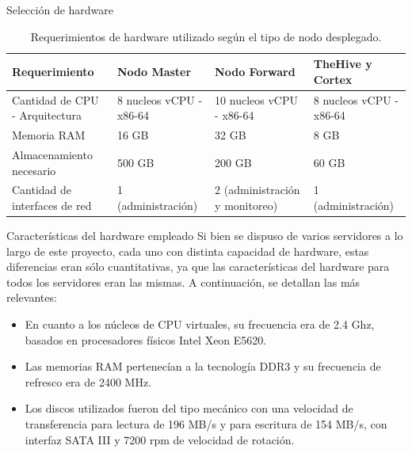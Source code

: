 \begin{subsection}{Selección de hardware}
\begin{table}[H]
\begin{tabular}{|m{9em}|m{9em}|m{9em}|m{9em}|}
                \hline 
                    Requerimiento  & Nodo Master &  Nodo Forward & TheHive y Cortex \\ 
                \hline
                    Cantidad de CPU - Arquitectura & 8 nucleos vCPU - x86-64 & 10 nucleos vCPU - x86-64 & 8 nucleos vCPU - x86-64 \\ 
                \hline
                    Memoria RAM  & 16 GB & 32 GB & 8 GB \\ 
                \hline
                    Almacenamiento necesario & 500 GB  & 200 GB & 60 GB \\
                \hline
            Cantidad de interfaces de red & 1 (administración) & 2 (administración y monitoreo) & 1 (administración) \\
                \hline %
            \end{tabular}
            \caption{Requerimientos de hardware utilizado según el tipo de nodo desplegado.}
            \label{table:12}
        \end{table}
    
    \end{subsection}
        \begin{subsubsection}{Características del hardware empleado}
            Si bien se dispuso de varios servidores a lo largo de este proyecto, cada uno con distinta capacidad de hardware, estas diferencias eran sólo cuantitativas, ya que las características del hardware para todos los servidores eran las mismas. A continuación, se detallan las más relevantes:
            \begin{itemize}
                \item En cuanto a los núcleos de CPU virtuales, su frecuencia era de 2.4 Ghz, basados en procesadores físicos Intel Xeon E5620.
                \item Las memorias RAM pertenecían a la tecnología DDR3 y su frecuencia de refresco era de 2400 MHz.
                \item Los discos utilizados fueron del tipo mecánico con una velocidad de transferencia para lectura de 196 MB/s y para escritura de 154 MB/s, con interfaz SATA III y 7200 rpm de velocidad de rotación.
            \end{itemize}
        \end{subsubsection}
    
